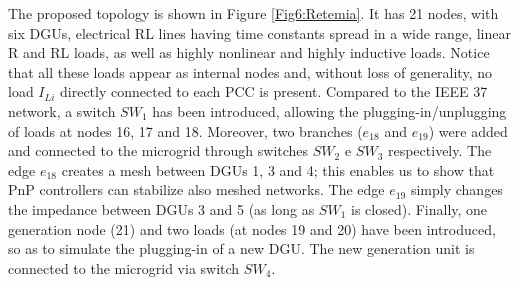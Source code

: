 \documentclass[a4paper]{article}
\theoremstyle{plain}
\begin{document}
	The proposed topology is shown in Figure \ref{Fig6:Retemia}. It has 21 nodes, with six DGUs, electrical RL lines having time constants
spread in a wide range, linear R and RL loads, as well as highly
nonlinear and highly inductive loads. Notice that all these loads appear as internal nodes and, without loss of generality, no load $I_{Li}$ directly connected to each PCC is present. Compared to the IEEE 37 network, a switch $SW_1$ has been introduced, allowing the
plugging-in/unplugging of loads at nodes 16, 17 and 18. Moreover, two branches
($e_{18}$ and $e_{19}$) were added and connected to the
microgrid through switches $SW_2$ e $SW_3$ respectively. The edge
$e_{18}$ creates a mesh between DGUs 1, 3 and 4; this enables us to
show that PnP controllers can stabilize also meshed
networks. The edge $e_{19}$ simply changes the impedance between DGUs 3
and 5 (as long as $SW_1$ is closed). Finally, one generation node (21)
and two loads (at nodes 19 and 20) have been introduced, so as to
simulate the plugging-in of a new DGU. The new generation unit is
connected to the microgrid via switch $SW_4$. 
\end{document}
